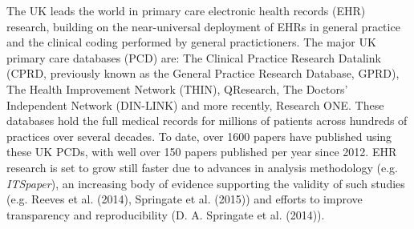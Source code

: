 \documentclass[]{article}
\begin{document}
The UK leads the world in primary care electronic health records (EHR)
research, building on the near-universal deployment of EHRs in general
practice and the clinical coding performed by general practictioners.
The major UK primary care databases (PCD) are: The Clinical Practice
Research Datalink (CPRD, previously known as the General Practice
Research Database, GPRD), The Health Improvement Network (THIN),
QResearch, The Doctors' Independent Network (DIN-LINK) and more
recently, Research ONE. These databases hold the full medical records
for millions of patients across hundreds of practices over several
decades. To date, over 1600 papers have published using these UK PCDs,
with well over 150 papers published per year since 2012. EHR research is
set to grow still faster due to advances in analysis methodology (e.g.
\emph{ITSpaper}), an increasing body of evidence supporting the validity
of such studies (e.g. Reeves et al. (2014), Springate et al. (2015)) and
efforts to improve transparency and reproducibility (D. A. Springate et
al. (2014)).
\end{document}

